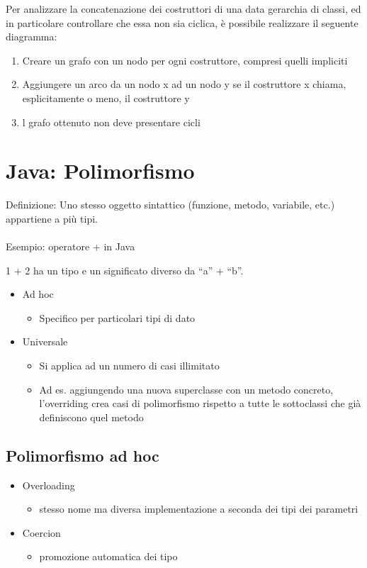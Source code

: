 \documentclass[10pt]{article}
\begin{document}
Per analizzare la concatenazione dei costruttori di una data gerarchia di classi, ed in particolare 
controllare che essa non sia ciclica, è possibile realizzare il seguente diagramma:
\begin{enumerate}
    \item Creare un grafo con un nodo per ogni costruttore, compresi quelli impliciti
    \item Aggiungere un arco da un nodo x ad un nodo y se il costruttore x chiama, esplicitamente o 
meno, il costruttore y
    \item l grafo ottenuto non deve presentare cicli
\end{enumerate}
\section{Java: Polimorfismo}
Definizione: Uno stesso oggetto sintattico (funzione, 
metodo, variabile, etc.) appartiene a più tipi.\\\\
Esempio: operatore + in Java

1 + 2 ha un tipo e un significato diverso da “a” + “b”.

\begin{itemize}
    \item Ad hoc
    \begin{itemize}
        \item Specifico per particolari tipi di dato
    \end{itemize}
    \item Universale
    \begin{itemize}
        \item Si applica ad un numero di casi illimitato
        \item Ad es. aggiungendo una nuova superclasse con un metodo 
        concreto, l'overriding crea casi di polimorfismo rispetto a 
        tutte le sottoclassi che già definiscono quel metodo
    \end{itemize}
\end{itemize}
\subsection{Polimorfismo ad hoc}
\begin{itemize}
    \item Overloading
    \begin{itemize}
        \item stesso nome ma diversa implementazione a seconda dei tipi dei parametri
    \end{itemize}
    \item Coercion
    \begin{itemize}
        \item promozione automatica dei tipo
    \end{itemize}
\end{itemize}
\end{document}
